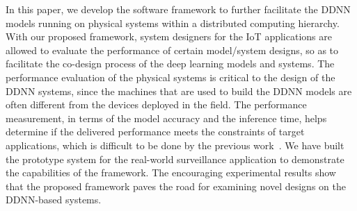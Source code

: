 \documentclass[format=acmsmall, review=false, screen=true]{acmart}
\begin{document}
In this paper, we develop the software framework to further facilitate the DDNN models running on physical systems within a distributed computing hierarchy. With our proposed framework, system designers for the IoT applications are allowed to evaluate the performance of certain model/system designs, so as to facilitate the co-design process of the deep learning models and systems. The performance evaluation of the physical systems is critical to the design of the DDNN systems, since the machines that are used to build the DDNN models are often different from the devices deployed in the field. The performance measurement, in terms of the model accuracy and the inference time, helps determine if the delivered performance meets the constraints of target applications, which is difficult to be done by the previous work~\cite{Teerapittayanon17}.
We have built the prototype system for the real-world surveillance application to demonstrate the capabilities of the framework. The encouraging experimental results show that the proposed framework paves the road for examining novel designs on the DDNN-based systems.


%
%
\end{document}
